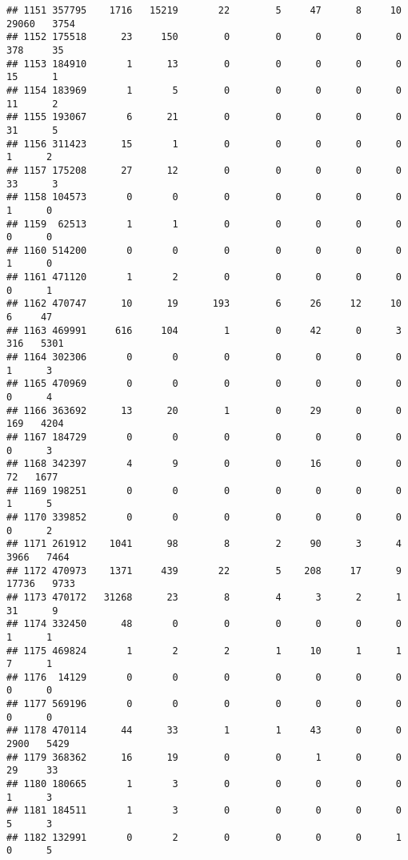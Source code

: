 \documentclass[
]{article}
\begin{document}
\begin{verbatim}
## 1151 357795    1716   15219       22        5     47      8     10 29060   3754
## 1152 175518      23     150        0        0      0      0      0   378     35
## 1153 184910       1      13        0        0      0      0      0    15      1
## 1154 183969       1       5        0        0      0      0      0    11      2
## 1155 193067       6      21        0        0      0      0      0    31      5
## 1156 311423      15       1        0        0      0      0      0     1      2
## 1157 175208      27      12        0        0      0      0      0    33      3
## 1158 104573       0       0        0        0      0      0      0     1      0
## 1159  62513       1       1        0        0      0      0      0     0      0
## 1160 514200       0       0        0        0      0      0      0     1      0
## 1161 471120       1       2        0        0      0      0      0     0      1
## 1162 470747      10      19      193        6     26     12     10     6     47
## 1163 469991     616     104        1        0     42      0      3   316   5301
## 1164 302306       0       0        0        0      0      0      0     1      3
## 1165 470969       0       0        0        0      0      0      0     0      4
## 1166 363692      13      20        1        0     29      0      0   169   4204
## 1167 184729       0       0        0        0      0      0      0     0      3
## 1168 342397       4       9        0        0     16      0      0    72   1677
## 1169 198251       0       0        0        0      0      0      0     1      5
## 1170 339852       0       0        0        0      0      0      0     0      2
## 1171 261912    1041      98        8        2     90      3      4  3966   7464
## 1172 470973    1371     439       22        5    208     17      9 17736   9733
## 1173 470172   31268      23        8        4      3      2      1    31      9
## 1174 332450      48       0        0        0      0      0      0     1      1
## 1175 469824       1       2        2        1     10      1      1     7      1
## 1176  14129       0       0        0        0      0      0      0     0      0
## 1177 569196       0       0        0        0      0      0      0     0      0
## 1178 470114      44      33        1        1     43      0      0  2900   5429
## 1179 368362      16      19        0        0      1      0      0    29     33
## 1180 180665       1       3        0        0      0      0      0     1      3
## 1181 184511       1       3        0        0      0      0      0     5      3
## 1182 132991       0       2        0        0      0      0      1     0      5

\end{verbatim}
\end{document}
